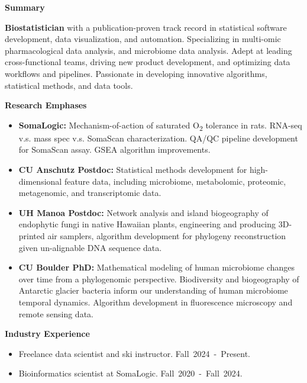 \documentclass{article}
\begin{document}
%
\vspace{2mm}
%
{\large\textbf{Summary}}
\begin{adjustwidth}{5mm}{}
  \textbf{Biostatistician} with a publication-proven track record in statistical software development, data visualization, and automation. Specializing in multi-omic pharmacological data analysis, and microbiome data analysis. Adept at leading cross-functional teams, driving new product development, and optimizing data workflows and pipelines. Passionate in developing innovative algorithms, statistical methods, and data tools. 
\end{adjustwidth}
\vspace{2mm}
%
{\large\textbf{Research Emphases}}
\begin{adjustwidth}{5mm}{}
  \begin{itemize}[noitemsep,topsep=0pt, leftmargin=5mm]
    \item \textbf{SomaLogic:} Mechanism-of-action of saturated O\textsubscript{2} tolerance in rats. RNA-seq v.s. mass spec v.s. SomaScan characterization. QA/QC pipeline development for SomaScan assay. GSEA algorithm improvements.
    \item \textbf{CU Anschutz Postdoc:} Statistical methods development for high-dimensional feature data, including microbiome, metabolomic, proteomic, metagenomic, and transcriptomic data.
    \item \textbf{UH Manoa Postdoc:} Network analysis and island biogeography of endophytic fungi in native Hawaiian plants, engineering and producing 3D-printed air samplers, algorithm development for phylogeny reconstruction given un-alignable DNA sequence data.
    \item \textbf{CU Boulder PhD:} Mathematical modeling of human microbiome changes over time from a phylogenomic perspective. Biodiversity and biogeography of Antarctic glacier bacteria inform our understanding of human microbiome temporal dynamics. Algorithm development in fluorescence microscopy and remote sensing data. 
  \end{itemize}
\end{adjustwidth}
%
\vspace{2mm} 
%
{\large  \textbf{Industry Experience}}
\begin{adjustwidth}{5mm}{}
  \begin{itemize}[noitemsep,topsep=0pt, leftmargin=5mm]
    \item Freelance data scientist and ski instructor.  \mbox{Fall 2024 - Present.}
    \item Bioinformatics scientist at SomaLogic. \mbox{Fall 2020 - Fall 2024.}
  \end{itemize}
\end{adjustwidth}
\end{document}
